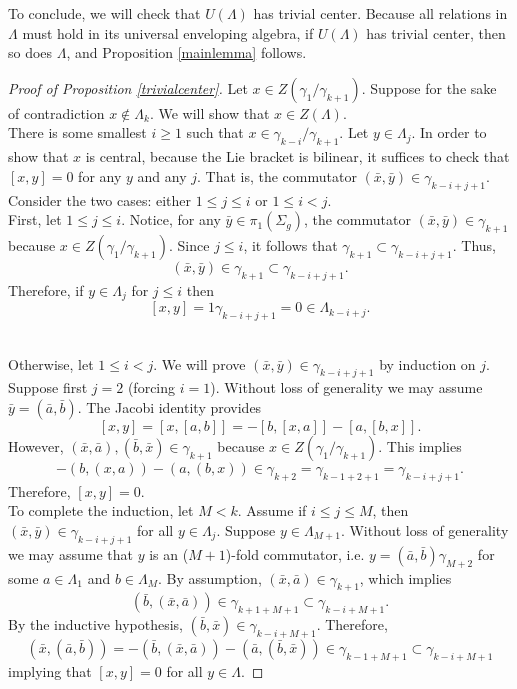 \documentclass[a4paper]{amsproc}
\theoremstyle{TheoremNum}
\theoremstyle{Theorembold}
\theoremstyle{TheoremboldDef}
\theoremstyle{TheoremboldRem}
\theoremstyle{TheoremboldRem}
\begin{document}
 To conclude, we will check that $U(\Lambda)$ has trivial center. Because all relations in $\Lambda$ must hold in its universal enveloping algebra, if $U(\Lambda)$ has trivial center, then so does $\Lambda$, and Proposition \ref{mainlemma} follows.

\begin{proof}[Proof of Proposition \ref{trivialcenter}\nopunct]
Let $x\in Z(\gamma_1/\gamma_{k+1})$. Suppose for the sake of contradiction $x\notin\Lambda_k$. We will show that $x\in Z(\Lambda)$.\\
 
There is some smallest $i{\geqslant} 1$ such that $x\in\gamma_{k-i}/\gamma_{k+1}$. Let $y\in \Lambda_j$. In order to show that $x$ is central, because the Lie bracket is bilinear, it suffices to check that $[x,y]=0$ for any $y$ and any $j$. That is, the commutator $(\bar{x},\bar{y})\in\gamma_{k-i+j+1}$.\\
  
  Consider the two cases: either $1{\leqslant} j{\leqslant} i$ or $1{\leqslant} i<j$.\\
  
   First, let $1{\leqslant} j{\leqslant} i$.
 Notice, for any $\bar{y}\in {\pi_1(\Sigma_g)}$, the commutator $(\bar{x},\bar{y})\in \gamma_{k+1}$ because $x\in Z(\gamma_1/\gamma_{k+1})$. Since $j{\leqslant} i$, it follows that $\gamma_{k+1}\subset{\gamma_{k-i+j+1}}$. Thus, \[(\bar{x},\bar{y})\in\gamma_{k+1}\subset{\gamma_{k-i+j+1}}.\] Therefore, if $y\in \Lambda_{j}$ for $j{\leqslant} i$ then \[[x,y]=1\gamma_{k-i+j+1}=0\in \Lambda_{k-i+j}.\]\\
 \item[] Otherwise, let $1{\leqslant} i<j$. We will prove $(\bar{x},\bar{y})\in\gamma_{k-i+j+1}$ by induction on $j$. Suppose first $j=2$ (forcing $i=1$). Without loss of generality we may assume $\bar{y}=(\bar{a},\bar{b})$. The Jacobi identity provides
 \[[x,y]=[x,[a,b]]=-[b,[x,a]]-[a,[b,x]].\]
 However, $(\bar{x},\bar{a}),(\bar{b},\bar{x})\in\gamma_{k+1}$ because $x\in Z(\gamma_1/\gamma_{k+1})$. This implies \[-(b,(x,a))-(a,(b,x))\in \gamma_{k+2}=\gamma_{k-1+2+1}=\gamma_{k-i+j+1}.\] Therefore, $[x,y]=0$.
\\

To complete the induction, let $M<k$. Assume if $i{\leqslant} j{\leqslant} M$, then $(\bar{x},\bar{y})\in\gamma_{k-i+j+1}$ for all $y\in\Lambda_j$. Suppose $y\in \Lambda_{M+1}$. Without loss of generality we may assume that $y$ is an ($M+1$)-fold commutator, i.e. $y=(\bar{a},\bar{b})\gamma_{M+2}$ for some $a\in\Lambda_1$ and $b\in \Lambda_{M}$. By assumption, $(\bar{x},\bar{a})\in\gamma_{k+1}$, which implies \[(\bar{b},(\bar{x},\bar{a}))\in \gamma_{k+1+M+1}\subset\gamma_{k-i+M+1}.\] By the inductive hypothesis, $(\bar{b},\bar{x})\in\gamma_{k-i+M+1}$. Therefore, \[(\bar{x},(\bar{a},\bar{b}))=-(\bar{b},(\bar{x},\bar{a}))-(\bar{a},(\bar{b},\bar{x}))\in \gamma_{k-1+M+1}\subset \gamma_{k-i+M+1}\] 
implying that $[x,y]=0$ for all $y\in \Lambda$. 


\end{proof}
\end{document}
